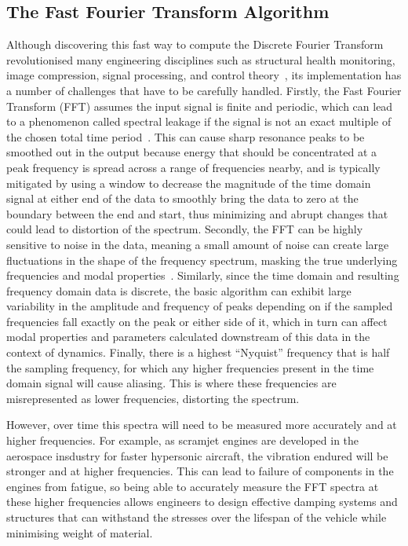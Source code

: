 \documentclass[12pt]{article}
\begin{document}
    \subsection{The Fast Fourier Transform Algorithm}
    Although discovering this fast way to compute the Discrete Fourier Transform revolutionised many engineering disciplines such as structural health monitoring, image compression, signal processing, and control theory~\cite{Byjus2023}, its implementation has a number of challenges that have to be carefully handled.
    Firstly, the Fast Fourier Transform (FFT) assumes the input signal is finite and periodic, which can lead to a phenomenon called spectral leakage if the signal is not an exact multiple of the chosen total time period~\cite{MathStackExchange2023}.
    This can cause sharp resonance peaks to be smoothed out in the output because energy that should be concentrated at a peak frequency is spread across a range of frequencies nearby, and is typically mitigated by using a window to decrease the magnitude of the time domain signal at either end of the data to smoothly bring the data to zero at the boundary between the end and start, thus minimizing and abrupt changes that could lead to distortion of the spectrum.
    Secondly, the FFT can be highly sensitive to noise in the data, meaning a small amount of noise can create large fluctuations in the shape of the frequency spectrum, masking the true underlying frequencies and modal properties~\cite{MathStackExchange2023}.
    Similarly, since the time domain and resulting frequency domain data is discrete, the basic algorithm can exhibit large variability in the amplitude and frequency of peaks depending on if the sampled frequencies fall exactly on the peak or either side of it, which in turn can affect modal properties and parameters calculated downstream of this data in the context of dynamics.
    Finally, there is a highest ``Nyquist'' frequency that is half the sampling frequency, for which any higher frequencies present in the time domain signal will cause aliasing.
    This is where these frequencies are misrepresented as lower frequencies, distorting the spectrum.

    However, over time this spectra will need to be measured more accurately and at higher frequencies.
    For example, as scramjet engines are developed in the aerospace insdustry for faster hypersonic aircraft, the vibration endured will be stronger and at higher frequencies.
    This can lead to failure of components in the engines from fatigue, so being able to accurately measure the FFT spectra at these higher frequencies allows engineers to design effective damping systems and structures that can withstand the stresses over the lifespan of the vehicle while minimising weight of material.
\end{document}
